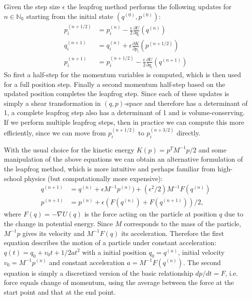 Given the step size $\epsilon$ the leapfrog method performs the following updates for $n \in \mathbb{N_0}$ starting from the initial state $(q^{(0)}, p^{(0)})$:
\begin{equation}
\begin{split}
p_i^{(n + 1/2)} &= p_i^{(n)} - \frac{\epsilon}{2} \frac{\partial U}{\partial q_i}(q^{(n)}) \\
q_i^{(n + 1)} &= q_i^{(n)} + \epsilon \frac{\partial K}{\partial p_i}(p^{(n + 1/2)}) \\
p_i^{(n + 1)} &= p_i^{(n + 1/2)} - \frac{\epsilon}{2} \frac{\partial U}{\partial q_i}(q^{(n + 1)})
\end{split}
\end{equation}
So first a half-step for the momentum variables is computed, which is then used for a full position step. Finally a second momentum half-step based on the updated position completes the leapfrog step. Since each of these updates is simply a shear transformation in $(q, p)$-space and therefore has a determinant of 1, a complete leapfrog step also has a determinant of 1 and is volume-conserving. If we perform multiple leapfrog steps, then in practice we can compute this more efficiently, since we can move from $p_i^{(n + 1/2)}$ to $p_i^{(n + 3/2)}$ directly.

With the usual choice for the kinetic energy $K(p) = p^T M^{-1} p /2$ and some manipulation of the above equations we can obtain an alternative formulation of the leapfrog method, which is more intuitive and perhaps familiar from high-school physics (but computationally more expensive):
\begin{equation}
\begin{split}
q^{(n + 1)} &= q^{(n)} + \epsilon M^{-1} p^{(n)}) + (\epsilon^2/2) M^{-1} F(q^{(n)}) \\
p^{(n + 1)} &= p^{(n)} + \epsilon (F(q^{(n)}) + F(q^{(n+1)}))/2,
\end{split}
\end{equation}
where $F(q) = - \nabla U(q)$ is the force acting on the particle at position $q$ due to the change in potential energy. Since $M$ corresponds to the mass of the particle, $M^{-1} p$ gives its velocity and $M^{-1} F(q)$ its acceleration. Therefore the first equation describes the motion of a particle under constant acceleration: $q(t) = q_0 + v_0 t + 1/2 a t^2$ with a initial position $q_0 = q^{(n)}$, initial velocity $v_0 = M^{-1} p^{(n)}$ and constant acceleration $a = M^{-1} F(q^{(n)})$. The second equation is simply a discretized version of the basic relationship $dp/dt = F$, i.e. force equals change of momentum, using the average between the force at the start point and that at the end point.

